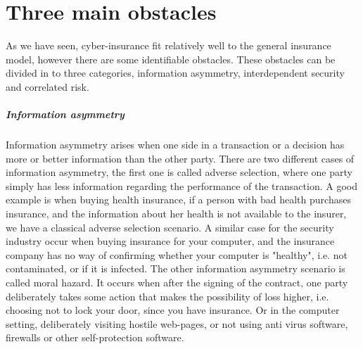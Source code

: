 \section{Three main obstacles}
\label{threemainobstacles}
As we have seen, cyber-insurance fit relatively well to the general insurance model, however there are some identifiable obstacles. These obstacles can be divided in to three categories, information asymmetry, interdependent security and  correlated risk. 
\subparagraph{Information asymmetry}
Information asymmetry arises when one side in a transaction or a decision has more or better
 information than the other party. There are two different cases of information asymmetry, the first
  one is called adverse selection, where one party simply has less information regarding the performance of
   the transaction. A good example is when buying health insurance, if a person with bad health purchases
    insurance, and the information about her health is not available to the insurer, we have a
     classical adverse selection scenario. A similar case for the security industry occur when buying
      insurance for your computer, and the insurance company has no way of confirming whether your
       computer is "healthy", i.e. not contaminated, or if it is infected. 
The other information asymmetry scenario is called moral hazard. It occurs when after the signing of
 the contract, one party deliberately takes some action that makes the possibility of loss higher,
  i.e. choosing not to lock your door, since you have insurance. Or in the computer setting,
   deliberately visiting hostile web-pages, or not using anti virus software, firewalls or other self-protection software.
    \cite{solutiontoinfoasym}
    
